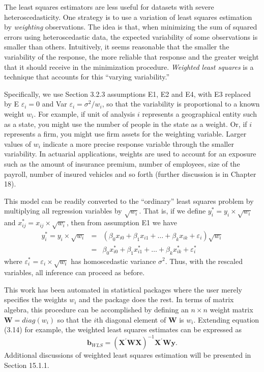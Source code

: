 The least squares estimators are less useful for datasets with
severe heteroscedasticity. One strategy is to use a variation of
least squares estimation by \emph{weighting} observations. The idea
is that, when minimizing the sum of squared errors using
heteroscedastic data, the expected variability of some observations
is smaller than others. Intuitively, it seems reasonable that the
smaller the variability of the response, the more reliable that
response and the greater weight that it should receive in the
minimization procedure. \textit{Weighted least squares} is a
technique that accounts for this ``varying variability.''

Specifically, we use Section 3.2.3 assumptions E1, E2 and E4, with
E3 replaced by E $\varepsilon_i = 0$ and Var $\varepsilon_i =
\sigma^2 / w_i$, so that the variability is proportional to a known
weight $w_i$. For example, if unit of analysis $i$ represents a
geographical entity such as a state, you might use the number of
people in the state as a weight. Or, if $i$ represents a firm, you
might use firm assets for the weighting variable. Larger values of
$w_i$ indicate a more precise response variable through the smaller
variability. In actuarial applications, weights are used to account
for an exposure such as the amount of insurance premium, number of
employees, size of the payroll, number of insured vehicles and so
forth (further discussion is in Chapter 18).

This model can be readily converted to the ``ordinary'' least
squares problem by multiplying all regression variables by
$\sqrt{w_i}.$ That is, if we define $y_i^{\ast} = y_i \times
\sqrt{w_i}$ and $x_{ij}^{\ast} = x_{ij} \times \sqrt{w_i}$, then
from assumption E1 we have
\begin{eqnarray*}
y_i^{\ast} = y_i \times \sqrt{w_i} &=& \left( \beta_0 x_{i0}+\beta_1
x_{i1}+\ldots+\beta_k x_{ik}+\varepsilon_i \right) \sqrt{w_i}\\
&=&\beta_0 x_{i0}^{\ast} +\beta_1 x_{i1}^{\ast}+\ldots+\beta_k
x_{ik}^{\ast} + \varepsilon_i^{\ast}
\end{eqnarray*}
where $\varepsilon_i^{\ast}=\varepsilon_i \times \sqrt{w_i}$ has
homoscedastic variance $\sigma^2$. Thus, with the rescaled
variables, all inference can proceed as before.

This work has been automated in statistical packages where the user
merely specifies the weights $w_i$ and the package does the rest. In
terms of matrix algebra, this procedure can be accomplished by
defining an $n \times n$ weight matrix $\mathbf{W} = diag(w_i)$ so
that the $i$th diagonal element of $\mathbf{W}$ is $w_i$. Extending
equation (3.14) for example, the weighted least squares estimates
can be expressed as
\begin{equation}\label{E5:WLSCoefficients}
\mathbf{b}_{WLS} = \left(\mathbf{X}^{\prime} \mathbf{W}\mathbf{X}
\right)^{-1}\mathbf{X}^{\prime} \mathbf{W}\mathbf{y} .
\end{equation}
Additional discussions of weighted least squares estimation will be
presented in Section 15.1.1.


